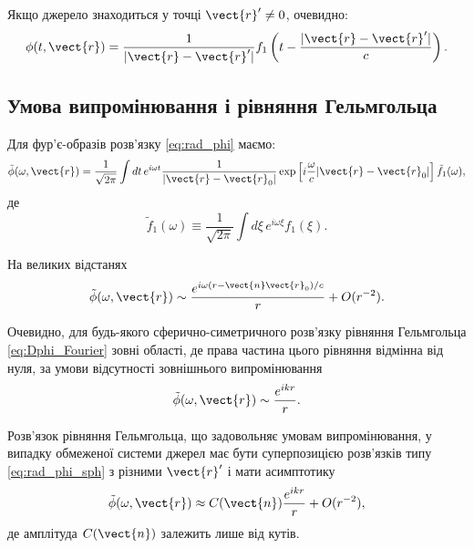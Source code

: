 Якщо джерело знаходиться у точці $\vect{r}' \neq 0$, очевидно:
\begin{equation}\label{eq:rad_phi}
	\phi(t, \vect{r}) = \frac1{|\vect{r} - \vect{r}'|} f_1\left( t - \frac{|\vect{r} - \vect{r}'|}c \right).
\end{equation}

\subsection*{Умова випромінювання і рівняння Гельмгольца}


Для фур'є-образів розв’язку \eqref{eq:rad_phi} маємо:
\begin{equation}
	\tilde{\phi} (\omega, \vect{r}) = \frac{1}{\sqrt{2\pi}} \int dt \, e^{i\omega t} \frac{1}{|\vect{r} - \vect{r}_0|}
	\exp \left[ i \frac{\omega}{c} |\vect{r} - \vect{r}_0| \right] \tilde{f}_1(\omega),
\end{equation}
де
\begin{equation}
	\tilde{f}_1 (\omega) \equiv \frac{1}{\sqrt{2\pi}} \int d\xi \, e^{i\omega \xi} f_1(\xi).
\end{equation}

На великих відстанях
\begin{equation}
	\tilde{\phi} (\omega, \vect{r}) \sim \frac{e^{i\omega (r - \vect{n} \vect{r}_0)/c}}{r} + O(r^{-2}).
\end{equation}

Очевидно, для будь-якого сферично-симетричного розв’язку рівняння Гельмгольца \eqref{eq:Dphi_Fourier} зовні області, де права частина цього рівняння
відмінна від нуля, за
умови відсутності зовнішнього випромінювання
\begin{equation}\label{eq:rad_phi_sph}
	\tilde{\phi} (\omega, \vect{r}) \sim \frac{e^{ikr}}{r}.
\end{equation}

Розв’язок рівняння Гельмгольца, що задовольняє умовам випромінювання, у випадку обмеженої системи джерел має бути суперпозицією розв’язків типу
\eqref{eq:rad_phi_sph} з
різними $\vect{r}'$ і мати асимптотику
\begin{equation}
	\tilde{\phi} (\omega, \vect{r}) \approx C(\vect{n}) \frac{e^{ikr}}{r} + O(r^{-2}),
\end{equation}
де амплітуда $C(\vect{n}) $ залежить лише від кутів.


